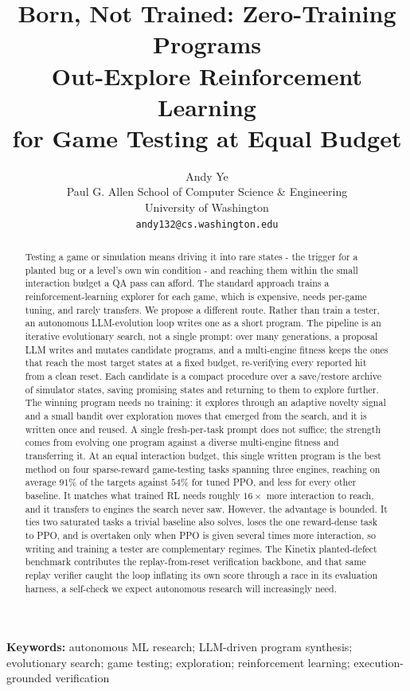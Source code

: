 \documentclass{article}
\title{Born, Not Trained: Zero-Training Programs\\Out-Explore Reinforcement Learning\\for Game Testing at Equal Budget}
\author{%
  Andy Ye \\
  Paul G. Allen School of Computer Science \& Engineering \\
  University of Washington \\
  \texttt{andy132@cs.washington.edu} \\
}
\begin{document}
\maketitle

\begin{abstract}
Testing a game or simulation means driving it into rare states - the trigger for a planted bug or a level's own win
condition - and reaching them within the small interaction budget a QA pass can afford. The standard approach trains a
reinforcement-learning explorer for each game, which is expensive, needs per-game tuning, and rarely transfers. We propose
a different route. Rather than train a tester, an autonomous LLM-evolution loop writes one as a short program. The pipeline
is an iterative evolutionary search, not a single prompt: over many generations, a proposal LLM writes and mutates
candidate programs, and a multi-engine fitness keeps the ones that reach the most target states at a fixed budget,
re-verifying every reported hit from a clean reset. Each candidate is a compact procedure over a save/restore archive of
simulator states, saving promising states and returning to them to explore further. The winning program needs no training:
it explores through an adaptive novelty signal and a small bandit over exploration moves that emerged from the search, and
it is written once and reused. A single fresh-per-task prompt does not suffice; the strength comes from evolving one
program against a diverse multi-engine fitness and transferring it. At an equal interaction budget, this single written
program is the best method on four sparse-reward game-testing tasks spanning three engines, reaching on average $91\%$ of
the targets against $54\%$ for tuned PPO, and less for every other baseline. It matches what trained RL needs roughly
$16\times$ more interaction to reach, and it transfers to engines the search never saw. However, the advantage is bounded. It ties two saturated tasks a trivial baseline also solves, loses the one reward-dense task to PPO, and is overtaken only when PPO is given several times more interaction, so writing and training a tester are complementary
regimes. The Kinetix planted-defect benchmark contributes the replay-from-reset verification backbone, and that same replay verifier caught the loop inflating its own score through a race in its evaluation harness, a self-check we expect autonomous research will
increasingly need.
\end{abstract}

\noindent\textbf{Keywords:} autonomous ML research; LLM-driven program synthesis; evolutionary search; game testing;
exploration; reinforcement learning; execution-grounded verification
\end{document}
